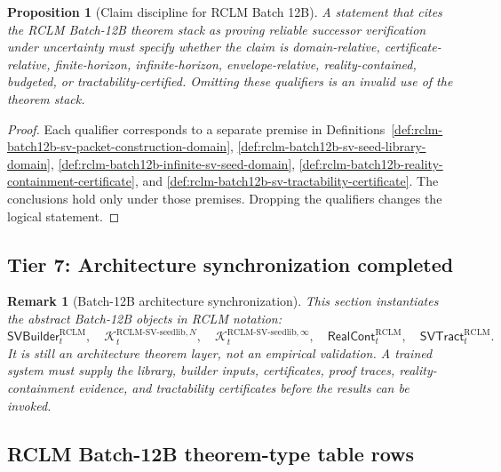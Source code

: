 \documentclass[11pt,a4paper]{article}
\newtheorem{proposition}[theorem]{Proposition}
\newtheorem{remark}[theorem]{Remark}
\newcommand{\Kcal}{\mathcal K}
\newcommand{\RCLM}{\mathrm{RCLM}}
\begin{document}
\begin{proposition}[Claim discipline for RCLM Batch 12B]
\label{prop:rclm-batch12b-claim-discipline}
A statement that cites the RCLM Batch-12B theorem stack as proving reliable successor verification under uncertainty must specify whether the claim is domain-relative, certificate-relative, finite-horizon, infinite-horizon, envelope-relative, reality-contained, budgeted, or tractability-certified. Omitting these qualifiers is an invalid use of the theorem stack.
\end{proposition}

\begin{proof}
Each qualifier corresponds to a separate premise in Definitions~\ref{def:rclm-batch12b-sv-packet-construction-domain}, \ref{def:rclm-batch12b-sv-seed-library-domain}, \ref{def:rclm-batch12b-infinite-sv-seed-domain}, \ref{def:rclm-batch12b-reality-containment-certificate}, and \ref{def:rclm-batch12b-sv-tractability-certificate}. The conclusions hold only under those premises. Dropping the qualifiers changes the logical statement.
\end{proof}

\subsection{Tier 7: Architecture synchronization completed}

\begin{remark}[Batch-12B architecture synchronization]
\label{rem:rclm-batch12b-architecture-sync-completed}
This section instantiates the abstract Batch-12B objects in RCLM notation:
\[
\mathsf{SVBuilder}_t^{\RCLM},
\quad
\Kcal_t^{\RCLM\text{-}\mathrm{SV\mbox{-}seedlib},N},
\quad
\Kcal_t^{\RCLM\text{-}\mathrm{SV\mbox{-}seedlib},\infty},
\quad
\mathsf{RealCont}_t^{\RCLM},
\quad
\mathsf{SVTract}_t^{\RCLM}.
\]
It is still an architecture theorem layer, not an empirical validation. A trained system must supply the library, builder inputs, certificates, proof traces, reality-containment evidence, and tractability certificates before the results can be invoked.
\end{remark}

\subsection{RCLM Batch-12B theorem-type table rows}
\end{document}
